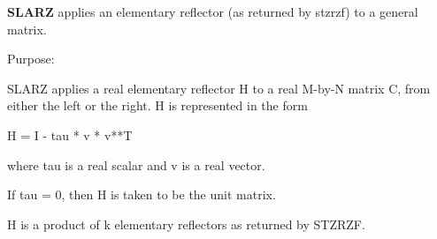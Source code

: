 {\bfseries S\+L\+A\+R\+Z} applies an elementary reflector (as returned by stzrzf) to a general matrix. 

 \begin{DoxyParagraph}{Purpose\+: }
\begin{DoxyVerb} SLARZ applies a real elementary reflector H to a real M-by-N
 matrix C, from either the left or the right. H is represented in the
 form

       H = I - tau * v * v**T

 where tau is a real scalar and v is a real vector.

 If tau = 0, then H is taken to be the unit matrix.


 H is a product of k elementary reflectors as returned by STZRZF.\end{DoxyVerb}
 
\end{DoxyParagraph}

